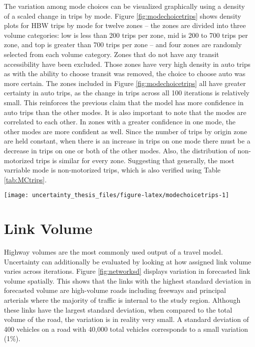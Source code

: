 \documentclass[fancy, masters, twoside]{byuthesis}
\begin{document}
The variation among mode choices can be visualized graphically using a density of a scaled change in trips by mode. Figure \ref{fig:modechoicetrips} shows density plots for HBW trips by mode for twelve zones -- the zones are divided into three volume categories: low is less than 200 trips per zone, mid is 200 to 700 trips per zone, and top is greater than 700 trips per zone -- and four zones are randomly selected from each volume category. Zones that do not have any transit accessibility have been excluded. Those zones have very high density in auto trips as with the ability to choose transit was removed, the choice to choose auto was more certain. The zones included in Figure \ref{fig:modechoicetrips} all have greater certainty in auto trips, as the change in trips across all 100 iterations is relatively small. This reinforces the previous claim that the model has more confidence in auto trips than the other modes. It is also important to note that the modes are correlated to each other. In zones with a greater confidence in one mode, the other modes are more confident as well. Since the number of trips by origin zone are held constant, when there is an increase in trips on one mode there must be a decrease in trips on one or both of the other modes. Also, the distribution of non-motorized trips is similar for every zone. Suggesting that generally, the most varriable mode is non-motorized trips, which is also verified using Table \ref{tab:MCtrips}.

\begin{sidewaysfigure}

{\centering \texttt{[image: uncertainty\_thesis\_files/figure-latex/modechoicetrips-1]} 

}

\caption{Trip density for coefficient of variation by mode for HBW trips.}\label{fig:modechoicetrips}
\end{sidewaysfigure}

\hypertarget{link-volume}{%
\section{Link Volume}\label{link-volume}}

Highway volumes are the most commonly used output of a travel model. Uncertainty can additionally be evaluated by looking at how assigned link volume varies across iterations. Figure \ref{fig:networksd} displays variation in forecasted link volume spatially. This shows that the links with the highest standard deviation in forecasted volume are high-volume roads including freeways and principal arterials where the majority of traffic is internal to the study region. Although these links have the largest standard deviation, when compared to the total volume of the road, the variation is in reality very small. A standard deviation of 400 vehicles on a road with 40,000 total vehicles corresponds to a small variation (1\%).
\end{document}
